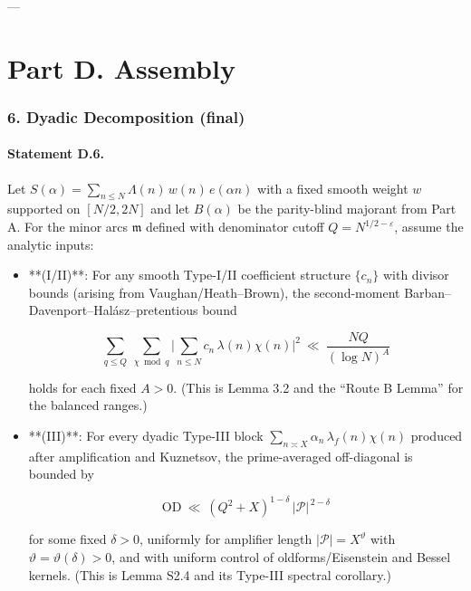 \documentclass[11pt]{article}
\theoremstyle{definition}
\theoremstyle{remark}
\begin{document}
---

\part*{Part D. Assembly}

\section*{6. Dyadic Decomposition (final)}

\subsection*{Statement D.6.}

Let $S(\alpha)=\sum_{n\le N}\Lambda(n)\,w(n)\,e(\alpha n)$ with a fixed smooth weight $w$ supported on $[N/2,2N]$ and let $B(\alpha)$ be the parity-blind majorant from Part A. For the minor arcs $\mathfrak m$ defined with denominator cutoff $Q=N^{1/2-\varepsilon}$, assume the analytic inputs:

\begin{itemize}
\item **(I/II)**: For any smooth Type-I/II coefficient structure $\{c_n\}$ with divisor bounds (arising from Vaughan/Heath–Brown), the second-moment Barban–Davenport–Halász–pretentious bound

\begin{equation}
\sum_{q\le Q}\ \sum_{\chi\bmod q}\Big|\sum_{n\le N} c_n\,\lambda(n)\chi(n)\Big|^2
\ \ll\ \frac{NQ}{(\log N)^A}
\tag{D.1}
\end{equation}

holds for each fixed $A>0$. (This is Lemma 3.2 and the “Route B Lemma” for the balanced ranges.)

\item **(III)**: For every dyadic Type-III block $\sum_{n\asymp X}\alpha_n\,\lambda_f(n)\chi(n)$ produced after amplification and Kuznetsov, the prime-averaged off-diagonal is bounded by

\begin{equation}
\mathrm{OD}\ \ll\ (Q^2+X)^{1-\delta}\,|\mathcal P|^{\,2-\delta}
\tag{D.2}
\end{equation}

for some fixed $\delta>0$, uniformly for amplifier length $|\mathcal P|=X^\vartheta$ with $\vartheta=\vartheta(\delta)>0$, and with uniform control of oldforms/Eisenstein and Bessel kernels. (This is Lemma S2.4 and its Type-III spectral corollary.)
\end{itemize}
\end{document}
